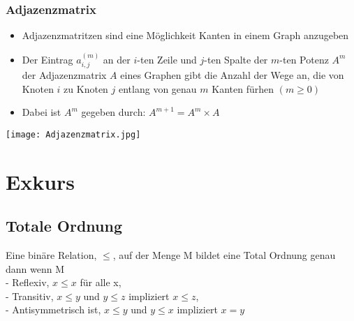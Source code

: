 		\subsubsection{Adjazenzmatrix}
			\begin{minipage}[t]{0.6\textwidth}
				\begin{itemize}
					\item Adjazenzmatritzen sind eine Möglichkeit Kanten in einem Graph anzugeben
					\item Der Eintrag $a^{(m)}_{i,j}$ an der $i$-ten Zeile und $j$-ten Spalte
						der $m$-ten Potenz $A^m$ der Adjazenzmatrix $A$ eines Graphen gibt die Anzahl
						der Wege an, die von Knoten $i$ zu Knoten $j$ entlang von genau $m$ Kanten 
						fürhen $(m\geq0)$
					\item Dabei ist $A^m$ gegeben durch: $A^{m+1} = A^m \times A$ 
				\end{itemize}
			\end{minipage}
			\begin{minipage}[t]{0.35\textwidth}
				\begin{center}
					\texttt{[image: Adjazenzmatrix.jpg]}
				\end{center}
			\end{minipage}


			
\newpage
\section{Exkurs}
	\subsection{Totale Ordnung}
		Eine binäre Relation, $\leq$, auf der Menge M bildet eine Total Ordnung genau dann wenn M \\
		- Reflexiv, $x \leq x$ für alle x, \\
		- Transitiv, $x \leq y$ und $y \leq z$ impliziert $x \leq z$, \\
		- Antisymmetrisch ist, $x \leq y$ und $y \leq x$ impliziert $x = y$



\vspace{1.5cm}
 